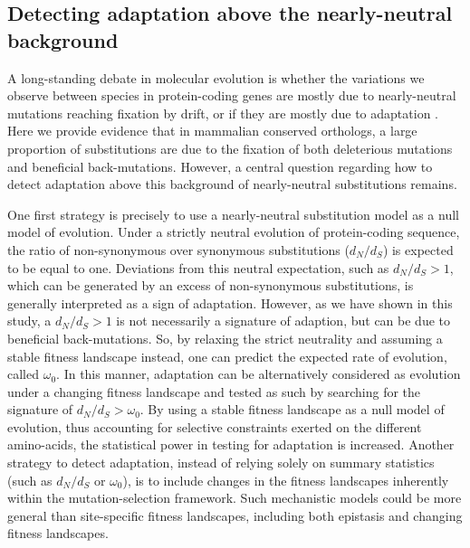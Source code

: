\documentclass{article}
\newcommand{\dn}{d_N}
\newcommand{\ds}{d_S}
\newcommand{\dnds}{\dn / \ds}
\begin{document}
    \subsection*{Detecting adaptation above the nearly-neutral background}

    A long-standing debate in molecular evolution is whether the variations we observe between species in protein-coding genes are mostly due to nearly-neutral mutations reaching fixation by drift, or if they are mostly due to adaptation \cite{kimura_evolutionary_1968,kern_neutral_2018,jensen_importance_2019,gillespie_substitution_1994,Ohta1992}.
    Here we provide evidence that in mammalian conserved orthologs, a large proportion of substitutions are due to the fixation of both deleterious mutations and beneficial back-mutations.
    However, a central question regarding how to detect adaptation above this background of nearly-neutral substitutions remains\cite{kimura_evolutionary_1968,ohta_development_1996}.

    One first strategy is precisely to use a nearly-neutral substitution model as a null model of evolution.
    Under a strictly neutral evolution of protein-coding sequence, the ratio of non-synonymous over synonymous substitutions ($\dnds$) is expected to be equal to one.
    Deviations from this neutral expectation, such as $\dnds > 1$, which can be generated by an excess of non-synonymous substitutions, is generally interpreted as a sign of adaptation.
    However, as we have shown in this study, a $\dnds > 1$ is not necessarily a signature of adaption, but can be due to beneficial back-mutations.
    So, by relaxing the strict neutrality and assuming a stable fitness landscape instead, one can predict the expected rate of evolution, called $\omega_0$\cite{spielman_relationship_2015, dosreis_how_2015}.
    In this manner, adaptation can be alternatively considered as evolution under a changing fitness landscape and tested as such by searching for the signature of $\dnds > \omega_0$\cite{cvijovic_fate_2015, rodrigue_detecting_2017, rodrigue_bayesian_2021}.
    By using a stable fitness landscape as a null model of evolution, thus accounting for selective constraints exerted on the different amino-acids, the statistical power in testing for adaptation is increased\cite{latrille_genes_2023}.
    Another strategy to detect adaptation, instead of relying solely on summary statistics (such as $\dnds$ or $\omega_0$), is to include changes in the fitness landscapes inherently within the mutation-selection framework\cite{tamuri_mutationselection_2021}.
    Such mechanistic models could be more general than site-specific fitness landscapes, including both epistasis and changing fitness landscapes\cite{goldstein_sequence_2017, stolyarova_senescence_2020}.
\end{document}
